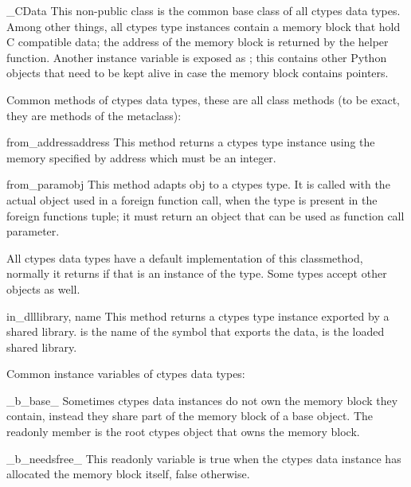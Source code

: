 \begin{classdesc*}{_CData}
This non-public class is the common base class of all ctypes data
types.  Among other things, all ctypes type instances contain a
memory block that hold C compatible data; the address of the
memory block is returned by the  helper function.
Another instance variable is exposed as ; this
contains other Python objects that need to be kept alive in case
the memory block contains pointers.
\end{classdesc*}

Common methods of ctypes data types, these are all class methods (to
be exact, they are methods of the metaclass):

\begin{methoddesc}{from_address}{address}
This method returns a ctypes type instance using the memory
specified by address which must be an integer.
\end{methoddesc}

\begin{methoddesc}{from_param}{obj}
This method adapts obj to a ctypes type.  It is called with the
actual object used in a foreign function call, when the type is
present in the foreign functions  tuple; it must
return an object that can be used as function call parameter.

All ctypes data types have a default implementation of this
classmethod, normally it returns  if that is an instance of
the type.  Some types accept other objects as well.
\end{methoddesc}

\begin{methoddesc}{in_dll}{library, name}
This method returns a ctypes type instance exported by a shared
library.  is the name of the symbol that exports the data,
 is the loaded shared library.
\end{methoddesc}

Common instance variables of ctypes data types:

\begin{memberdesc}{_b_base_}
Sometimes ctypes data instances do not own the memory block they
contain, instead they share part of the memory block of a base
object.  The  readonly member is the root ctypes
object that owns the memory block.
\end{memberdesc}

\begin{memberdesc}{_b_needsfree_}
This readonly variable is true when the ctypes data instance has
allocated the memory block itself, false otherwise.
\end{memberdesc}

